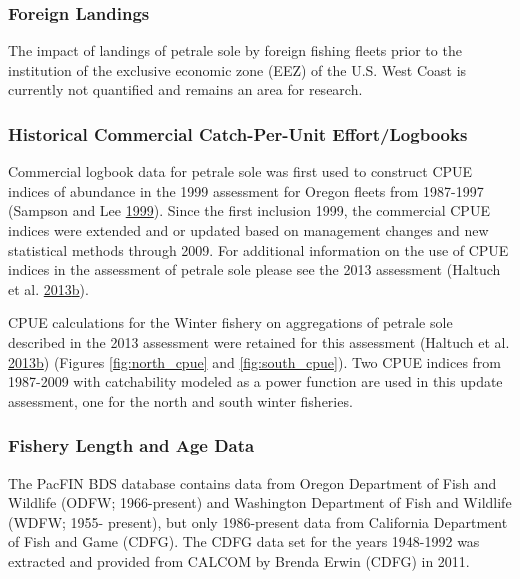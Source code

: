 \documentclass[12pt,]{article}
\begin{document}
\subsubsection{Foreign Landings}\label{foreign-landings}

The impact of landings of petrale sole by foreign fishing fleets prior
to the institution of the exclusive economic zone (EEZ) of the U.S. West
Coast is currently not quantified and remains an area for research.

\subsubsection{Historical Commercial Catch-Per-Unit
Effort/Logbooks}\label{historical-commercial-catch-per-unit-effortlogbooks}

Commercial logbook data for petrale sole was first used to construct
CPUE indices of abundance in the 1999 assessment for Oregon fleets from
1987-1997 (Sampson and Lee
\protect\hyperlink{ref-sampson_assessment_1999}{1999}). Since the first
inclusion 1999, the commercial CPUE indices were extended and or updated
based on management changes and new statistical methods through 2009.
For additional information on the use of CPUE indices in the assessment
of petrale sole please see the 2013 assessment (Haltuch et al.
\protect\hyperlink{ref-haltuch_status_2013}{2013}\protect\hyperlink{ref-haltuch_status_2013}{b}).

CPUE calculations for the Winter fishery on aggregations of petrale sole
described in the 2013 assessment were retained for this assessment
(Haltuch et al.
\protect\hyperlink{ref-haltuch_status_2013}{2013}\protect\hyperlink{ref-haltuch_status_2013}{b})
(Figures \ref{fig:north_cpue} and \ref{fig:south_cpue}). Two CPUE
indices from 1987-2009 with catchability modeled as a power function are
used in this update assessment, one for the north and south winter
fisheries.

\subsubsection{Fishery Length and Age
Data}\label{fishery-length-and-age-data}

The PacFIN BDS database contains data from Oregon Department of Fish and
Wildlife (ODFW; 1966-present) and Washington Department of Fish and
Wildlife (WDFW; 1955- present), but only 1986-present data from
California Department of Fish and Game (CDFG). The CDFG data set for the
years 1948-1992 was extracted and provided from CALCOM by Brenda Erwin
(CDFG) in 2011.
\end{document}

